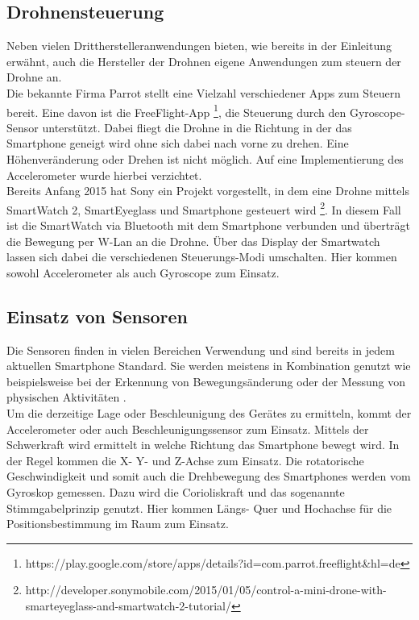 \documentclass{article}
\begin{document}
\subsection{Drohnensteuerung}
Neben vielen Drittherstelleranwendungen bieten, wie bereits in der Einleitung erwähnt, auch die Hersteller der Drohnen eigene Anwendungen zum steuern der Drohne an.
\\ Die bekannte Firma Parrot stellt eine Vielzahl verschiedener Apps zum Steuern bereit. Eine davon ist die FreeFlight-App \footnote{https://play.google.com/store/apps/details?id=com.parrot.freeflight\&hl=de}, die Steuerung durch den Gyroscope-Sensor unterstützt. Dabei fliegt die Drohne in die Richtung in der das Smartphone geneigt wird ohne sich dabei nach vorne zu drehen. Eine Höhenveränderung oder Drehen ist nicht möglich. Auf eine Implementierung des Accelerometer wurde hierbei verzichtet.
\\Bereits Anfang 2015 hat Sony ein Projekt vorgestellt, in dem eine Drohne mittels SmartWatch 2, SmartEyeglass und Smartphone gesteuert wird \footnote{http://developer.sonymobile.com/2015/01/05/control-a-mini-drone-with-smarteyeglass-and-smartwatch-2-tutorial/}. In diesem Fall ist die SmartWatch via Bluetooth mit dem Smartphone verbunden und überträgt die Bewegung per W-Lan an die Drohne. Über das Display der Smartwatch lassen sich dabei die verschiedenen Steuerungs-Modi umschalten. Hier kommen sowohl Accelerometer als auch Gyroscope zum Einsatz.

\subsection{Einsatz von Sensoren}
Die Sensoren finden in vielen Bereichen Verwendung und sind bereits in jedem aktuellen Smartphone Standard. Sie werden meistens in Kombination genutzt wie beispielsweise bei der Erkennung von Bewegungsänderung oder der Messung von physischen Aktivitäten \cite{wu2012classification}. 
\\Um die derzeitige Lage oder Beschleunigung des Gerätes zu ermitteln, kommt der Accelerometer oder auch Beschleunigungssensor zum Einsatz. Mittels der Schwerkraft wird ermittelt in welche Richtung das Smartphone bewegt wird. In der Regel kommen die X- Y- und Z-Achse zum Einsatz. Die rotatorische Geschwindigkeit und somit auch die Drehbewegung des Smartphones werden vom Gyroskop gemessen. Dazu wird die Corioliskraft und das sogenannte Stimmgabelprinzip genutzt. Hier kommen Längs- Quer und Hochachse für die Positionsbestimmung im Raum zum Einsatz.
\end{document}

